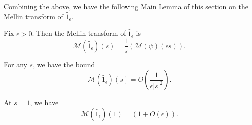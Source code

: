 Combining the above, we have the following Main Lemma of this section on the Mellin transform of $\widetilde{1_{\epsilon}}$.
\begin{lemma}\label{MellinOfSmooth1}
Fix  $\epsilon>0$. Then the Mellin transform of $\widetilde{1_{\epsilon}}$ is
$$\mathcal{M}(\widetilde{1_{\epsilon}})(s) = \frac{1}{s}\left(\mathcal{M}(\psi)\left(\epsilon s\right)\right).$$

For any $s$, we have the bound
$$\mathcal{M}(\widetilde{1_{\epsilon}})(s) = O\left(\frac{1}{\epsilon|s|^2}\right).$$

At $s=1$, we have
$$\mathcal{M}(\widetilde{1_{\epsilon}})(1) = (1+O(\epsilon)).$$
\end{lemma}


